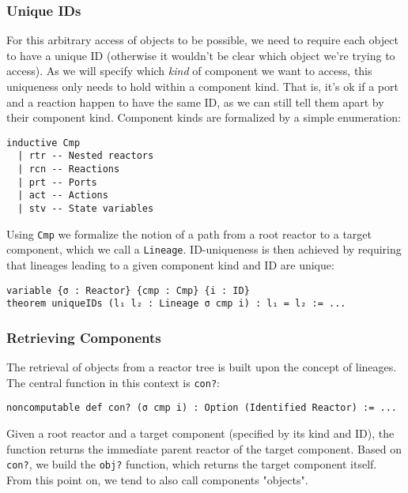 \subsubsection{Unique IDs}

For this arbitrary access of objects to be possible, we need to require each object to have a unique ID (otherwise it wouldn't be clear which object we're trying to access).
As we will specify which \emph{kind} of component we want to access, this uniqueness only needs to hold within a component kind.
That is, it's ok if a port and a reaction happen to have the same ID, as we can still tell them apart by their component kind.
Component kinds are formalized by a simple enumeration:

\begin{lstlisting}
inductive Cmp
  | rtr -- Nested reactors
  | rcn -- Reactions
  | prt -- Ports
  | act -- Actions
  | stv -- State variables
\end{lstlisting}

Using \lstinline{Cmp} we formalize the notion of a path from a root reactor to a target component, which we call a \lstinline{Lineage}.
ID-uniqueness is then achieved by requiring that lineages leading to a given component kind and ID are unique:

\begin{lstlisting}
variable {σ : Reactor} {cmp : Cmp} {i : ID}
theorem uniqueIDs (l₁ l₂ : Lineage σ cmp i) : l₁ = l₂ := ...
\end{lstlisting}

\subsubsection{Retrieving Components}

The retrieval of objects from a reactor tree is built upon the concept of lineages.
The central function in this context is \lstinline{con?}:

\begin{lstlisting}
noncomputable def con? (σ cmp i) : Option (Identified Reactor) := ...
\end{lstlisting}

Given a root reactor and a target component (specified by its kind and ID), the function returns the immediate parent reactor of the target component.
Based on \lstinline{con?}, we build the \lstinline{obj?} function, which returns the target component itself.
From this point on, we tend to also call components "objects".

